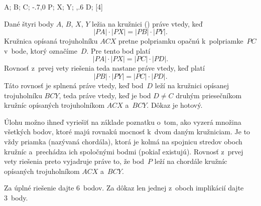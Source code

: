 {%
\fontplace
\tpoint A; \tpoint B; \bpoint C;
\lbpoint\xy-.7,0 P; \lBpoint X; \rBpoint Y;
\bpoint{},.6 D;
[4] \hfil\Obr

Dané štyri body $A$, $B$, $X$, $Y$ ležia na kružnici (\obr) práve vtedy, keď
$$
|PA|\cdot|PX|=|PB|\cdot|PY|.
$$
Kružnica opísaná trojuholníku $ACX$ pretne polpriamku opačnú
k~polpriamke~$PC$ v~bode, ktorý označíme~$D$. Pre tento bod platí
$$
|PA|\cdot|PX|=|PC|\cdot|PD|.
$$
Rovnosť z~prvej vety riešenia teda nastane práve vtedy, keď platí
$$
|PB|\cdot|PY|=|PC|\cdot|PD|.
$$
Táto rovnosť je splnená práve vtedy, keď bod~$D$ leží na kružnici
opísanej trojuholníku $BCY$, teda práve vtedy, keď je bod $D\ne C$ druhým
priesečníkom kružníc opísaných trojuholníkom $ACX$ a~$BCY$. Dôkaz je
hotový.
\inspicture{}

\poznamka
Úlohu možno ihneď vyriešiť na základe
poznatku o~tom, ako vyzerá množina všetkých bodov, ktoré majú rovnakú
mocnosť k~dvom daným kružniciam. Je to vždy priamka (nazývaná chordála),
ktorá je kolmá na spojnicu stredov oboch kružníc a~prechádza ich spoločnými
bodmi (pokiaľ existujú). Rovnosť z~prvej vety riešenia preto
vyjadruje práve to, že bod~$P$ leží na chordále kružníc opísaných
trojuholníkom $ACX$ a~$BCY$.



\nobreak\medskip\petit\noindent
Za úplné riešenie dajte 6~bodov. Za dôkaz len jednej z~oboch implikácií dajte
3~body.
\endpetit
\bigbreak}

